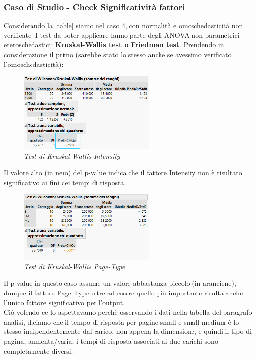 \subsubsection{Caso di Studio - Check Significatività fattori}
Considerando la \ref{table} siamo nel caso 4, con normalità e omoschedasticità non verificate. I test da poter applicare fanno parte degli ANOVA non parametrici eteroschedastici: \textbf{Kruskal-Wallis test o Friedman test}.
Prendendo in considerazione il primo (sarebbe stato lo stesso anche se avessimo verificato l'omoschedasticità):
\begin{figure}[H]
	\centering
	\includegraphics[width=0.6\textwidth]{img/hw4/KW_i.png}
	\caption{\textit{Test di Kruskal-Wallis Intensity}}
\end{figure}
Il valore alto (in nero) del p-value indica che il fattore Intensity non è risultato significativo ai fini dei tempi di risposta.
\begin{figure}[H]
	\centering
	\includegraphics[width=0.6\textwidth]{img/hw4/KW_pt.png}
	\caption{\textit{Test di Kruskal-Wallis Page-Type}}
\end{figure}
Il p-value in questo caso assume un valore abbastanza piccolo (in arancione), dunque il fattore Page-Type oltre ad essere quello più importante risulta anche l'unico fattore significativo per l'output.
\\Ciò volendo ce lo aspettavamo perchè osservando i dati nella tabella del paragrafo analisi, diciamo che il tempo di risposta per pagine small e small-medium è lo stesso indipendentemente dal carico, non appena la dimensione, e quindi il tipo di pagina, aumenta/varia, i tempi di risposta associati ai due carichi sono completamente diversi. 